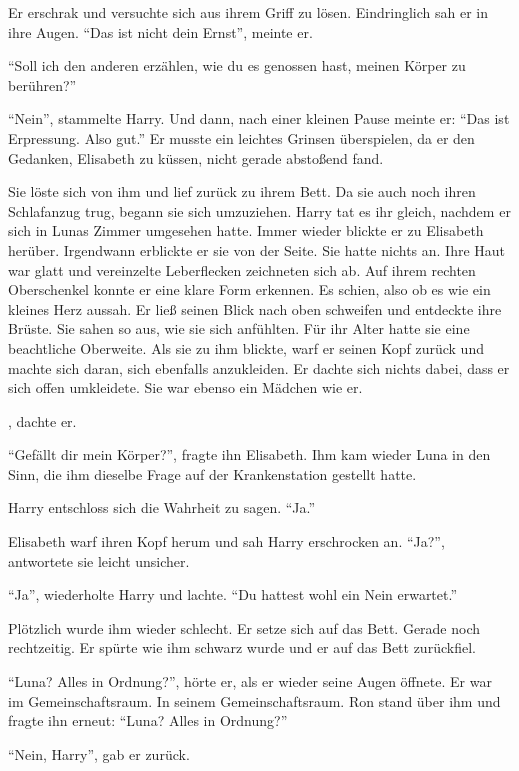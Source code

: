 Er erschrak und versuchte sich aus ihrem Griff zu lösen. Eindringlich sah er in ihre Augen. \enquote{Das ist nicht dein Ernst}, meinte er.

\enquote{Soll ich den anderen erzählen, wie du es genossen hast, meinen Körper zu berühren?}

\enquote{Nein}, stammelte Harry. Und dann, nach einer kleinen Pause meinte er: \enquote{Das ist Erpressung. Also gut.} Er musste ein leichtes Grinsen überspielen, da er den Gedanken, Elisabeth zu küssen, nicht gerade abstoßend fand.

Sie löste sich von ihm und lief zurück zu ihrem Bett. Da sie auch noch ihren Schlafanzug trug, begann sie sich umzuziehen. Harry tat es ihr gleich, nachdem er sich in Lunas Zimmer umgesehen hatte. Immer wieder blickte er zu Elisabeth herüber. Irgendwann erblickte er sie von der Seite. Sie hatte nichts an. Ihre Haut war glatt und vereinzelte Leberflecken zeichneten sich ab. Auf ihrem rechten Oberschenkel konnte er eine klare Form erkennen. Es schien, also ob es wie ein kleines Herz aussah. Er ließ seinen Blick nach oben schweifen und entdeckte ihre Brüste. Sie sahen so aus, wie sie sich anfühlten. Für ihr Alter hatte sie eine beachtliche Oberweite. Als sie zu ihm blickte, warf er seinen Kopf zurück und machte sich daran, sich ebenfalls anzukleiden. Er dachte sich nichts dabei, dass er sich offen umkleidete. Sie war ebenso ein Mädchen wie er.

, dachte er.

\enquote{Gefällt dir mein Körper?}, fragte ihn Elisabeth. Ihm kam wieder Luna in den Sinn, die ihm dieselbe Frage auf der Krankenstation gestellt hatte.

Harry entschloss sich die Wahrheit zu sagen. \enquote{Ja.}

Elisabeth warf ihren Kopf herum und sah Harry erschrocken an. \enquote{Ja?}, antwortete sie leicht unsicher.

\enquote{Ja}, wiederholte Harry und lachte. \enquote{Du hattest wohl ein Nein erwartet.}

Plötzlich wurde ihm wieder schlecht. Er setze sich auf das Bett. Gerade noch rechtzeitig. Er spürte wie ihm schwarz wurde und er auf das Bett zurückfiel.

\enquote{Luna? Alles in Ordnung?}, hörte er, als er wieder seine Augen öffnete. Er war im Gemeinschaftsraum. In seinem Gemeinschaftsraum. Ron stand über ihm und fragte ihn erneut: \enquote{Luna? Alles in Ordnung?}

\enquote{Nein, Harry}, gab er zurück.

